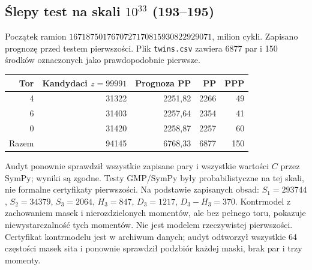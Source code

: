 \documentclass[11pt,a4paper]{article}
\theoremstyle{definition}\newtheorem{defn}[tw]{Definicja}
\theoremstyle{remark}\newtheorem*{uw}{Uwaga}
\begin{document}
\subsection{Ślepy test na skali $10^{33}$ (193--195)}
Początek ramion $1671875017670727170815930822929071$, milion cykli.
Zapisano prognozę przed testem pierwszości. Plik \texttt{twins.csv} zawiera
6877 par i 150 środków oznaczonych jako prawdopodobnie pierwsze.
\begin{center}
\begin{tabular}{rrrrr}
\toprule Tor&Kandydaci $z=99991$&Prognoza PP&PP&PPP\\\midrule
4&31322&2251,82&2266&49\\6&31403&2257,64&2354&41\\0&31420&2258,87&2257&60\\\midrule
Razem&94145&6768,33&6877&150\\\bottomrule
\end{tabular}
\end{center}
Audyt ponownie sprawdził wszystkie zapisane pary i wszystkie wartości $C$ przez SymPy; wyniki są zgodne. Testy GMP/SymPy były probabilistyczne na tej skali, nie formalne certyfikaty pierwszości. Na podstawie zapisanych obsad: $S_1=293744$, $S_2=34379$,
$S_3=2064$, $H_3=847$, $D_3=1217$, $D_3-H_3=370$.
Kontrmodel z zachowaniem masek i nierozdzielonych momentów, ale bez pełnego
toru, pokazuje niewystarczalność tych momentów. Nie jest modelem rzeczywistej
pierwszości. Certyfikat kontrmodelu jest w archiwum danych; audyt odtworzył wszystkie 64 częstości masek sita i ponownie sprawdził podzbiór każdej maski, brak par i trzy momenty.
\end{document}
